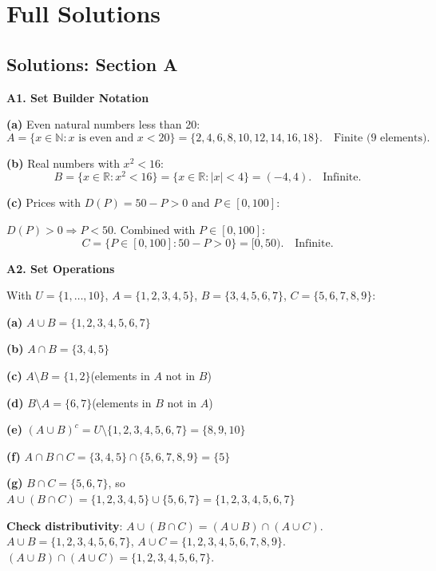 \documentclass[12pt, a4paper]{article}
\theoremstyle{definition}
\newcommand{\R}{\mathbb{R}}
\newcommand{\N}{\mathbb{N}}
\begin{document}
\section{Full Solutions}

\subsection{Solutions: Section A}

\begin{solbox}
\textbf{A1. Set Builder Notation}

\textbf{(a)} Even natural numbers less than 20:
\[A = \{x \in \N : x \text{ is even and } x < 20\} = \{2, 4, 6, 8, 10, 12, 14, 16, 18\}.\quad\text{Finite (9 elements).}\]

\textbf{(b)} Real numbers with $x^2 < 16$:
\[B = \{x \in \R : x^2 < 16\} = \{x \in \R : |x| < 4\} = (-4, 4).\quad\text{Infinite.}\]

\textbf{(c)} Prices with $D(P) = 50 - P > 0$ and $P \in [0,100]$:

$D(P) > 0 \Rightarrow P < 50$. Combined with $P \in [0,100]$:
\[C = \{P \in [0,100] : 50 - P > 0\} = [0, 50).\quad\text{Infinite.}\]
\end{solbox}

\begin{solbox}
\textbf{A2. Set Operations}

With $U=\{1,\ldots,10\}$, $A=\{1,2,3,4,5\}$, $B=\{3,4,5,6,7\}$, $C=\{5,6,7,8,9\}$:

\textbf{(a)} $A \cup B = \{1,2,3,4,5,6,7\}$

\textbf{(b)} $A \cap B = \{3,4,5\}$

\textbf{(c)} $A \setminus B = \{1,2\}$\quad (elements in $A$ not in $B$)

\textbf{(d)} $B \setminus A = \{6,7\}$\quad (elements in $B$ not in $A$)

\textbf{(e)} $(A \cup B)^c = U \setminus \{1,2,3,4,5,6,7\} = \{8,9,10\}$

\textbf{(f)} $A \cap B \cap C = \{3,4,5\} \cap \{5,6,7,8,9\} = \{5\}$

\textbf{(g)} $B \cap C = \{5,6,7\}$, so $A \cup (B \cap C) = \{1,2,3,4,5\} \cup \{5,6,7\} = \{1,2,3,4,5,6,7\}$

\textbf{Check distributivity}: $A \cup (B \cap C) = (A \cup B) \cap (A \cup C)$.
$A \cup B = \{1,2,3,4,5,6,7\}$, $A \cup C = \{1,2,3,4,5,6,7,8,9\}$.
$(A\cup B)\cap(A\cup C) = \{1,2,3,4,5,6,7\}$. \checkmark
\end{solbox}
\end{document}

